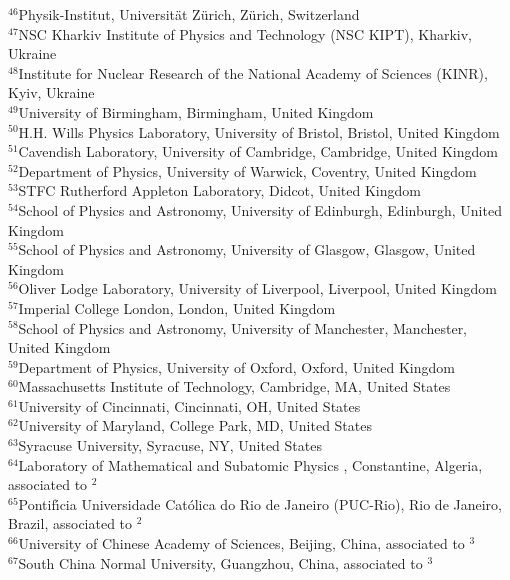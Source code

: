 \begin{flushleft}
{$ ^{46}$Physik-Institut, Universit{\"a}t Z{\"u}rich, Z{\"u}rich, Switzerland\\
$ ^{47}$NSC Kharkiv Institute of Physics and Technology (NSC KIPT), Kharkiv, Ukraine\\
$ ^{48}$Institute for Nuclear Research of the National Academy of Sciences (KINR), Kyiv, Ukraine\\
$ ^{49}$University of Birmingham, Birmingham, United Kingdom\\
$ ^{50}$H.H. Wills Physics Laboratory, University of Bristol, Bristol, United Kingdom\\
$ ^{51}$Cavendish Laboratory, University of Cambridge, Cambridge, United Kingdom\\
$ ^{52}$Department of Physics, University of Warwick, Coventry, United Kingdom\\
$ ^{53}$STFC Rutherford Appleton Laboratory, Didcot, United Kingdom\\
$ ^{54}$School of Physics and Astronomy, University of Edinburgh, Edinburgh, United Kingdom\\
$ ^{55}$School of Physics and Astronomy, University of Glasgow, Glasgow, United Kingdom\\
$ ^{56}$Oliver Lodge Laboratory, University of Liverpool, Liverpool, United Kingdom\\
$ ^{57}$Imperial College London, London, United Kingdom\\
$ ^{58}$School of Physics and Astronomy, University of Manchester, Manchester, United Kingdom\\
$ ^{59}$Department of Physics, University of Oxford, Oxford, United Kingdom\\
$ ^{60}$Massachusetts Institute of Technology, Cambridge, MA, United States\\
$ ^{61}$University of Cincinnati, Cincinnati, OH, United States\\
$ ^{62}$University of Maryland, College Park, MD, United States\\
$ ^{63}$Syracuse University, Syracuse, NY, United States\\
$ ^{64}$Laboratory of Mathematical and Subatomic Physics , Constantine, Algeria, associated to $^{2}$\\
$ ^{65}$Pontif{\'\i}cia Universidade Cat{\'o}lica do Rio de Janeiro (PUC-Rio), Rio de Janeiro, Brazil, associated to $^{2}$\\
$ ^{66}$University of Chinese Academy of Sciences, Beijing, China, associated to $^{3}$\\
$ ^{67}$South China Normal University, Guangzhou, China, associated to $^{3}$\\
}
\end{flushleft}
